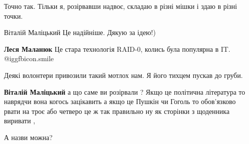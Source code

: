  
Точно так. Тільки я, розірвавши надвоє, складаю в різні мішки і здаю в різні
точки.

 
Віталій Маліцький Це надійніше. Дякую за ідею!)

 
\textbf{Леся Маланюк} Це стара технологія RAID-0, колись була популярна в IT.  @igg{fbicon.smile} 

 
Деякі волонтери привозили такий мотлох нам. Я його тихцем пускав до груби.

 
\textbf{Віталій Маліцький} а що саме ви розірвали ? Якщо це політична література то наврядчи вона когось зацікавить а якщо це Пушкін чи Гоголь то обов'язково рвати на троє або четверо це ж так правильно ну як сторінки з щоденника виривати ,

 
А назви можна?

